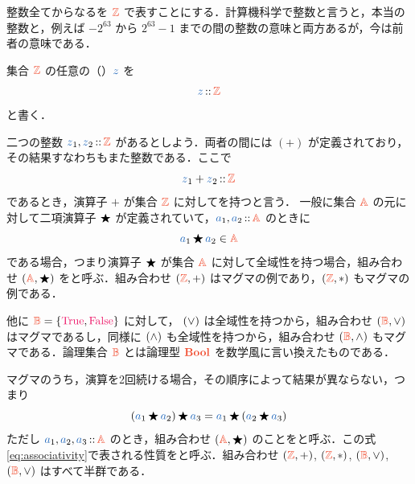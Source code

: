 \documentclass[a5paper,twoside,fleqn,draft]{jsbook}
\begin{document}
整数全てからなるを $\mZSet$ で表すことにする．計算機科学で整数と言うと，本当の整数と，例えば $-2^{63}$ から $2^{63}-1$ までの間の整数の意味と両方あるが，今は前者の意味である．

集合 $\mZSet$ の任意の（）$\hVar{z}$ を
\begin{equation}
  \hVar{z}
  \mIn\mZSet
\end{equation}
と書く．

二つの整数 $\hVar{z}_1,\hVar{z}_2\mIn\mZSet$ があるとしよう．両者の間には $(+)$ が定義されており，その結果すなわちもまた整数である．ここで
\begin{equation}
  \hVar{z}_1+\hVar{z}_2
  \mIn\mZSet
\end{equation}
であるとき，演算子 $+$ が集合 $\mZSet$ に対してを持つと言う．
一般に集合 $\mASet$ の元に対して二項演算子 $\operatorname{\bigstar}$ が定義されていて，$\hVar{a}_1,\hVar{a}_2\mIn\mASet$ のときに
\begin{equation}
  \label{eq:totality}
  \hVar{a}_1\hAnyBinOp \hVar{a}_2
  \in\mASet
\end{equation}
である場合，つまり演算子 $\operatorname{\bigstar}$ が集合 $\mASet$ に対して全域性を持つ場合，組み合わせ $\mTupleWith{\mASet,\hAnyBinOp}$ をと呼ぶ．組み合わせ $\mTupleWith{\mZSet,+}$ はマグマの例であり，$\mTupleWith{\mZSet,*}$ もマグマの例である．

他に $\mBSet=\{\hTrue,\hFalse\}$ に対して， $(\operatorname{\vee})$ は全域性を持つから，組み合わせ $\mTupleWith{\mBSet,\mLogicalOr}$ はマグマであるし，同様に $(\operatorname{\wedge})$ も全域性を持つから，組み合わせ $\mTupleWith{\mBSet,\mLogicalAnd}$ もマグマである．論理集合 $\mBSet$ とは論理型 $\mBoolType$ を数学風に言い換えたものである．

マグマのうち，演算を2回続ける場合，その順序によって結果が異ならない，つまり
\begin{equation}
  \label{eq:associativity}
  \left(\hVar{a}_1\hAnyBinOp \hVar{a}_2\right)\hAnyBinOp \hVar{a}_3
  =\hVar{a}_1\hAnyBinOp\left(\hVar{a}_2\hAnyBinOp{\hVar{a}_3}\right)
\end{equation}
ただし $\hVar{a}_1,\hVar{a}_2,\hVar{a}_3\mIn\mASet$ のとき，組み合わせ $\mTupleWith{\mASet,\hAnyBinOp}$ のことをと呼ぶ．この式\eqref{eq:associativity}で表される性質をと呼ぶ．組み合わせ $\mTupleWith{\mZSet,+}$, $\mTupleWith{\mZSet,*}$, $\mTupleWith{\mBSet,\mLogicalOr}$, $\mTupleWith{\mBSet,\mLogicalOr}$ はすべて半群である．
\end{document}
